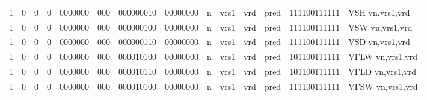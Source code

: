 \begin{landscape}
\begin{table}[p]
\begin{small}
\begin{center}
\begin{tabular}{p{0.08in}@{}p{0.08in}@{}p{0.08in}@{}p{0.08in}@{}p{0.50in}@{}p{0.30in}@{}p{0.08in}@{}p{0.8in}@{}p{0.48in}@{}p{0.32in}@{}p{0.08in}@{}p{0.8in}@{}p{0.8in}@{}p{0.4in}@{}p{0.56in}l}
\multicolumn{1}{|c|}{1} &
\multicolumn{1}{c|}{0} &
\multicolumn{1}{c|}{0} &
\multicolumn{1}{c|}{0} &
\multicolumn{1}{c|}{0000000} &
\multicolumn{1}{c|}{000} &
\multicolumn{2}{c|}{000000010} &
\multicolumn{2}{c|}{00000000} &
\multicolumn{1}{c|}{n} &
\multicolumn{1}{c|}{vrs1} &
\multicolumn{1}{c|}{vrd} &
\multicolumn{1}{c|}{pred} &
\multicolumn{1}{c|}{111100111111} & VSH vn,vrs1,vrd \\
\cline{1-15}
  

\multicolumn{1}{|c|}{1} &
\multicolumn{1}{c|}{0} &
\multicolumn{1}{c|}{0} &
\multicolumn{1}{c|}{0} &
\multicolumn{1}{c|}{0000000} &
\multicolumn{1}{c|}{000} &
\multicolumn{2}{c|}{000000100} &
\multicolumn{2}{c|}{00000000} &
\multicolumn{1}{c|}{n} &
\multicolumn{1}{c|}{vrs1} &
\multicolumn{1}{c|}{vrd} &
\multicolumn{1}{c|}{pred} &
\multicolumn{1}{c|}{111100111111} & VSW vn,vrs1,vrd \\
\cline{1-15}
  

\multicolumn{1}{|c|}{1} &
\multicolumn{1}{c|}{0} &
\multicolumn{1}{c|}{0} &
\multicolumn{1}{c|}{0} &
\multicolumn{1}{c|}{0000000} &
\multicolumn{1}{c|}{000} &
\multicolumn{2}{c|}{000000110} &
\multicolumn{2}{c|}{00000000} &
\multicolumn{1}{c|}{n} &
\multicolumn{1}{c|}{vrs1} &
\multicolumn{1}{c|}{vrd} &
\multicolumn{1}{c|}{pred} &
\multicolumn{1}{c|}{111100111111} & VSD vn,vrs1,vrd \\
\cline{1-15}
  

\multicolumn{1}{|c|}{1} &
\multicolumn{1}{c|}{0} &
\multicolumn{1}{c|}{0} &
\multicolumn{1}{c|}{0} &
\multicolumn{1}{c|}{0000000} &
\multicolumn{1}{c|}{000} &
\multicolumn{2}{c|}{000010100} &
\multicolumn{2}{c|}{00000000} &
\multicolumn{1}{c|}{n} &
\multicolumn{1}{c|}{vrs1} &
\multicolumn{1}{c|}{vrd} &
\multicolumn{1}{c|}{pred} &
\multicolumn{1}{c|}{101100111111} & VFLW vn,vrs1,vrd \\
\cline{1-15}
  

\multicolumn{1}{|c|}{1} &
\multicolumn{1}{c|}{0} &
\multicolumn{1}{c|}{0} &
\multicolumn{1}{c|}{0} &
\multicolumn{1}{c|}{0000000} &
\multicolumn{1}{c|}{000} &
\multicolumn{2}{c|}{000010110} &
\multicolumn{2}{c|}{00000000} &
\multicolumn{1}{c|}{n} &
\multicolumn{1}{c|}{vrs1} &
\multicolumn{1}{c|}{vrd} &
\multicolumn{1}{c|}{pred} &
\multicolumn{1}{c|}{101100111111} & VFLD vn,vrs1,vrd \\
\cline{1-15}
  

\multicolumn{1}{|c|}{1} &
\multicolumn{1}{c|}{0} &
\multicolumn{1}{c|}{0} &
\multicolumn{1}{c|}{0} &
\multicolumn{1}{c|}{0000000} &
\multicolumn{1}{c|}{000} &
\multicolumn{2}{c|}{000010100} &
\multicolumn{2}{c|}{00000000} &
\multicolumn{1}{c|}{n} &
\multicolumn{1}{c|}{vrs1} &
\multicolumn{1}{c|}{vrd} &
\multicolumn{1}{c|}{pred} &
\multicolumn{1}{c|}{111100111111} & VFSW vn,vrs1,vrd \\
\cline{1-15}
  


\end{tabular}
\end{center}
\end{small}
\end{table}
\end{landscape}
